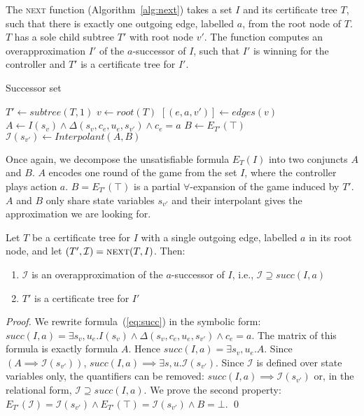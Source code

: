 The \textsc{next} function (Algorithm~\ref{alg:next}) takes a set $I$ and its certificate tree $T$, such
that there is exactly one outgoing edge, labelled $a$, from the root node of $T$.
$T$ has a sole child subtree $T'$ with root node $v'$.
The function computes an overapproximation $I'$ of the $a$-successor of $I$,
such that $I'$ is winning for the controller and $T'$ is a certificate tree for $I'$.

\begin{algorithm}
   \caption{Successor set}\label{alg:next}
   \begin{algorithmic}[1]
            \State $T' \gets subtree(T, 1)$
            \State $v \gets root(T)$
            \State $[(e,a,v')] \gets edges(v)$
            \State $A \gets I(s_v) \land  \Delta(s_v, c_e, u_e, s_{v'}) \land c_e = a$\label{alg:strat:partition:Ai}
            \State $B \gets E_{T'}(\top)$\label{alg:strat:partition:Bi}
            \State $\mathcal{I}(s_{v'}) \gets Interpolant(A, B)$\label{alg:strat:partition:I}
            \State {} \label{alg:strat:partition:return}
        \EndFunction
    \end{algorithmic}
\end{algorithm}

Once again, we decompose the unsatisfiable formula $E_T(I)$ into
two conjuncts $A$ and $B$.  $A$ encodes one round of the game
from the set $I$, where the controller plays action $a$.
$B = E_{T'}(\top)$ is a partial $\forall$-expansion of the game induced by $T'$.
$A$ and $B$ only share state variables $s_{v'}$ and their interpolant
gives the approximation we are looking for.

\begin{proposition}\label{prop:next}
    Let $T$ be a certificate tree for $I$ with a single outgoing
    edge, labelled $a$ in its root node, and let $(T',\mathcal{I})
    = \textsc{next}(T,I)$.
    Then:
    \begin{enumerate}
        \item $\mathcal{I}$ is an overapproximation of the
            $a$-successor of $I$, i.e., $\mathcal{I} \supseteq
            succ(I, a)$
        \item $T'$ is a certificate tree for $I'$
    \end{enumerate}
\end{proposition}
\begin{proof}
We rewrite formula~(\ref{eq:succ}) in the symbolic form:
$succ(I, a) = \exists s_v,u_e. I(s_v) \land
\Delta(s_v,c_e,u_e,s_{v'}) \land c_e = a$.  The matrix of
this formula is exactly formula $A$.  Hence $succ(I,a) =
\exists s_v,u_e. A$.  Since $(A\implies
\mathcal{I}(s_{v'}))$, $succ(I,a) \implies \exists s,u.
\mathcal{I}(s_{v'})$.  Since $\mathcal{I}$ is defined over
state variables only, the quantifiers can be removed:
$succ(I,a) \implies \mathcal{I}(s_{v'})$ or, in the
relational form, $\mathcal{I} \supseteq succ(I, a)$.
We prove the second property:
$E_{T'}(\mathcal{I}) = \mathcal{I}(s_{v'}) \land
E_{T'}(\top) = \mathcal{I}(s_{v'}) \land B = \bot$.
    \qed
\end{proof}

